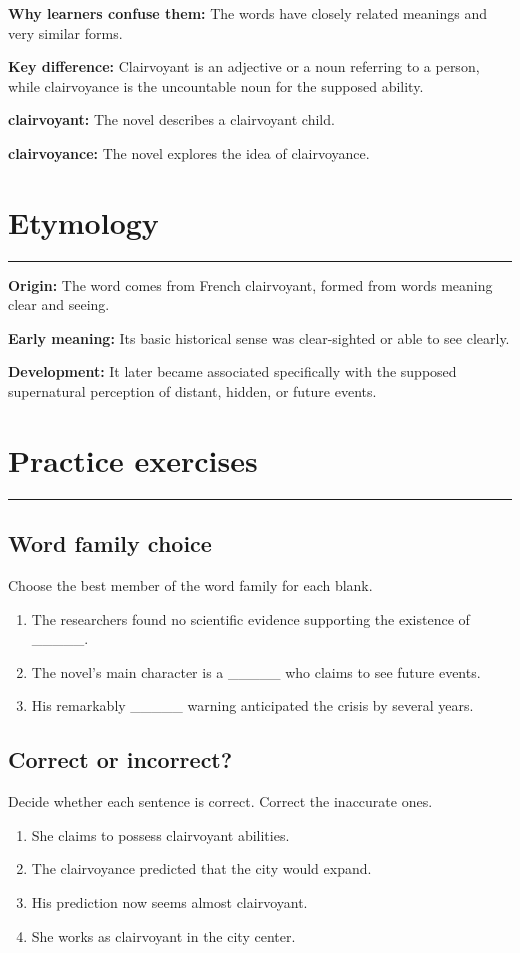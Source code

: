 \documentclass[11pt]{article}
\newcommand{\sectionrule}{\par\vspace{-0.5em}\noindent\textcolor{Accent}{\rule{\linewidth}{0.6pt}}\par}
\begin{document}
\textbf{Why learners confuse them:} The words have closely related meanings and very similar forms.

\textbf{Key difference:} Clairvoyant is an adjective or a noun referring to a person, while clairvoyance is the uncountable noun for the supposed ability.

\textbf{clairvoyant:} The novel describes a clairvoyant child.

\textbf{clairvoyance:} The novel explores the idea of clairvoyance.

\section{Etymology}
\sectionrule
\textbf{Origin:} The word comes from French clairvoyant, formed from words meaning clear and seeing.

\textbf{Early meaning:} Its basic historical sense was clear-sighted or able to see clearly.

\textbf{Development:} It later became associated specifically with the supposed supernatural perception of distant, hidden, or future events.

\section{Practice exercises}
\sectionrule
\subsection{Word family choice}
Choose the best member of the word family for each blank.

\begin{enumerate}
  \item The researchers found no scientific evidence supporting the existence of \_\_\_\_\_.
  \item The novel's main character is a \_\_\_\_\_ who claims to see future events.
  \item His remarkably \_\_\_\_\_ warning anticipated the crisis by several years.
\end{enumerate}

\subsection{Correct or incorrect?}
Decide whether each sentence is correct. Correct the inaccurate ones.

\begin{enumerate}
  \item She claims to possess clairvoyant abilities.
  \item The clairvoyance predicted that the city would expand.
  \item His prediction now seems almost clairvoyant.
  \item She works as clairvoyant in the city center.
\end{enumerate}
\end{document}
